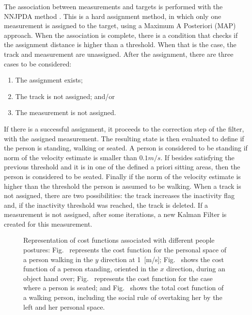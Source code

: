 \documentclass[5p,time]{elsarticle}
\begin{document}
The association between measurements and targets is performed with the NNJPDA method \cite{Bar2009}. This is a hard assignment method, in which only one measurement is assigned to the target, using a Maximum A Posteriori (MAP) approach. When the association is complete, there is a condition that checks if the assignment distance is higher than a threshold. When that is the case, the track and measurement are unassigned. After the assignment, there are three cases to be considered:
\begin{enumerate}
	\item{The assignment exists;} 
	\item{The track is not assigned; and/or} 
	\item{The measurement is not assigned.} 
\end{enumerate}
If there is a successful assignment, it proceeds to the correction step of the filter, with the assigned measurement. The resulting state is then evaluated to define if the person is standing, walking or seated. A person is considered to be standing if norm of the velocity estimate is smaller than $0.1m/s$. If besides satisfying the previous threshold and it is in one of the defined a priori sitting areas, then the person is considered to be seated. Finally if the norm of the velocity estimate is higher than the threshold the person is assumed to be walking.
When a track is not assigned, there are two possibilities: the track increases the inactivity flag and, if the inactivity threshold was reached, the track is deleted. If a measurement is not assigned, after some iterations, a new Kalman Filter is created for this measurement.

\begin{figure*}
	\vspace{-0.25cm}
	\centering
	\hfill
	\hfill
	\hfill
	\caption{Representation of cost functions associated with different people postures: Fig.~\protect{} represents the cost function for the personal space of a person walking in the $y$ direction at 1~[m/s]; Fig.~\protect{} shows the cost function of a person standing, oriented in the $x$ direction, during an object hand over; Fig.~\protect{} represents the cost function for the case where a person is seated; and Fig.~\protect{} shows the total cost function of a walking person, including the social rule of overtaking her by the left and her personal space.}
	\label{fig:as_gauss}
\end{figure*}
\end{document}
